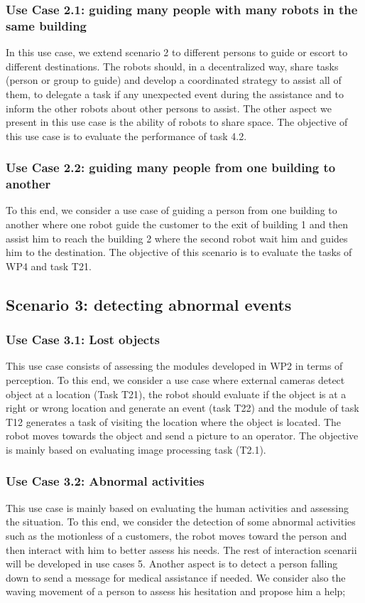 \subsubsection*{Use Case 2.1: guiding many people with many robots in the same building}
In this use case, we extend  scenario 2 to different persons to guide or escort to different destinations. The robots should, in a decentralized way, share tasks (person or group to guide) and develop a coordinated strategy to assist all of them, to delegate a task if any unexpected event during the assistance and to inform the other robots about other persons to assist. The other aspect we present in this use case is the ability of robots to share space. 
The objective of this use case is to evaluate the performance of task 4.2.

\subsubsection*{Use Case 2.2: guiding many people from one building to another}
To this end,  we consider a use case  of guiding a person from one building to another where one robot guide the customer to the exit of building 1 and then  assist him to reach the building 2 where the second robot wait him and guides him to the destination. 
The objective of this scenario is to evaluate the tasks of WP4 and task T21. 

\subsection{ Scenario 3: detecting abnormal events}

\subsubsection*{Use Case 3.1: Lost objects}
This use case consists of assessing the modules developed in WP2 in terms of perception. To this end, we consider a use case where external cameras detect object at a location (Task T21), the robot should evaluate if the  object is at a right or wrong location and generate an event (task T22) and the module of task T12 generates a task of visiting the location where the object is located. The robot moves towards the object and send a picture to an operator. 
The objective is mainly based on evaluating image processing task (T2.1).

\subsubsection*{Use Case 3.2: Abnormal activities}
This use case is mainly based on evaluating the human activities and assessing the situation. To this end, we consider the detection of some abnormal activities such as 
 the motionless of a customers, the robot moves toward the person and then interact with him to better assess his needs. The rest of interaction scenarii will be developed in use cases 5. Another aspect is to detect a person falling down to send a message for medical assistance if needed. We consider also the waving movement of a person to assess his hesitation and propose him a help;  

